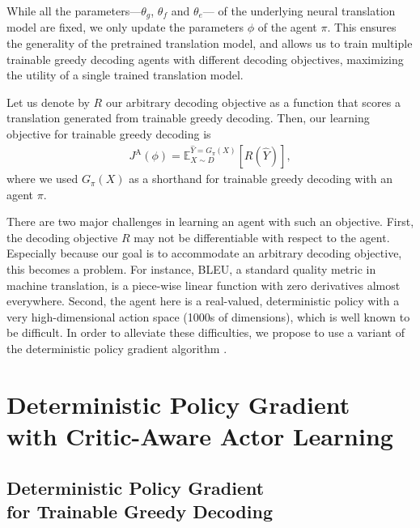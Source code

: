 While all the parameters---$\theta_g$, $\theta_f$ and $\theta_e$--- of the underlying neural translation model are fixed, we only update the parameters $\phi$ of the agent $\pi$. This ensures the generality of the pretrained translation model, and allows us to train multiple trainable greedy decoding agents with different decoding objectives, maximizing the utility of a single trained translation model. 

Let us denote by $R$ our arbitrary decoding objective as a function that scores a translation generated from trainable greedy decoding. Then, our learning objective for trainable greedy decoding is 
\begin{align*}
J^{\text{A}}(\phi) = \mathbb{E}_{X \sim D}^{\hat{Y}=G_{\pi}(X)}\left[R(\hat{Y})\right],
\end{align*}
where we used $G_{\pi}(X)$ as a shorthand for trainable greedy decoding with an agent $\pi$. 

There are two major challenges in learning an agent with such an objective. First, the decoding objective $R$ may not be differentiable with respect to the agent. Especially because our goal is to accommodate an arbitrary decoding objective, this becomes a problem. For instance, BLEU, a standard quality metric in machine translation, is a piece-wise linear function with zero derivatives almost everywhere. Second, the agent here is a real-valued, deterministic policy with a very high-dimensional action space (1000s of dimensions), which is well known to be difficult. In order to alleviate these difficulties, we propose to use a variant of the deterministic policy gradient algorithm \citep{silver2014deterministic,lillicrap2015continuous}.

\section{Deterministic Policy Gradient \\ with Critic-Aware Actor Learning}

\subsection{Deterministic Policy Gradient \\ for Trainable Greedy Decoding}

